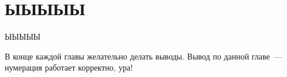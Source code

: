 \chapter{ЫЫЫЫЫ}
ЫЫЫЫЫ

\chapterconclusion

В конце каждой главы желательно делать выводы. Вывод по данной главе~--- нумерация работает корректно, ура!

\endinput

